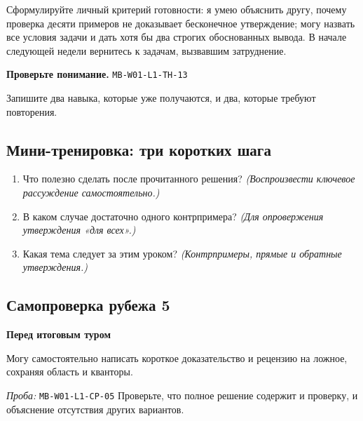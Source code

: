 \documentclass[11pt,a4paper,openany]{book}
\newcommand{\mtag}[1]{\textsf{\small\color{mbaccent}\bfseries #1}}
\newcommand{\muid}[1]{\texttt{\footnotesize #1}}
\begin{document}
Сформулируйте личный критерий готовности: я умею объяснить другу, почему проверка десяти примеров не доказывает бесконечное утверждение; могу назвать все условия задачи и дать хотя бы два строгих обоснованных вывода. В начале следующей недели вернитесь к задачам, вызвавшим затруднение.


\begin{center}
\end{center}

\begin{learnbox}\textbf{Проверьте понимание.} \muid{MB-W01-L1-TH-13}\par Запишите два навыка, которые уже получаются, и два, которые требуют повторения.\end{learnbox}

\subsection*{Мини-тренировка: три коротких шага}
\begin{enumerate}[label=\arabic*),leftmargin=*,itemsep=3pt]

\item Что полезно сделать после прочитанного решения? \textit{(Воспроизвести ключевое рассуждение самостоятельно.)}

\item В каком случае достаточно одного контрпримера? \textit{(Для опровержения утверждения «для всех».)}

\item Какая тема следует за этим уроком? \textit{(Контрпримеры, прямые и обратные утверждения.)}

\end{enumerate}

\subsection*{Самопроверка рубежа 5}\mtag{Перед итоговым туром}\par Могу самостоятельно написать короткое доказательство и рецензию на ложное, сохраняя область и кванторы.\par \textit{Проба:} \muid{MB-W01-L1-CP-05} Проверьте, что полное решение содержит и проверку, и объяснение отсутствия других вариантов.
\end{document}
